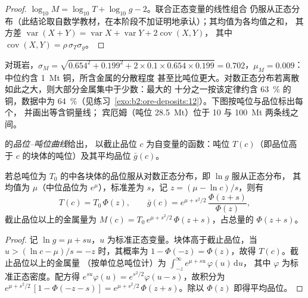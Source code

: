 \begin{proof}
$\log_{10} M = \log_{10} T + \log_{10} g - 2$。联合正态变量的线性组合
仍服从正态分布（此结论取自数学教材，在本阶段不加证明地承认）；其均值为各均值之和，
其方差 $\operatorname{var}(X + Y) = \operatorname{var} X + \operatorname{var} Y + 2\operatorname{cov}(X, Y)$，
其中 $\operatorname{cov}(X, Y) = \rho\,\sigma_T\sigma_g$。
\end{proof}

对斑岩，$\sigma_M = \sqrt{0.654^2 + 0.199^2 + 2 \times 0.1 \times 0.654 \times
0.199} = 0.702$，$\mu_M = 0.009$：中位约含 \qty{1}{Mt} 铜，所含金属的分散程度
甚至比吨位更大。对数正态分布若离散如此之大，则大部分金属集中于少数：最大的
十分之一按该定律约含 \qty{63}{\percent} 的
铜，数据中为 \qty{64}{\percent}（见练习~\ref{exo:b2:ore-deposits:12}）。下图按吨位与品位标出每个，
并画出等含铜量线；
宾厄姆（吨位 \qty{28.5}{Mt}）位于 10 与 \qty{100}{Mt} 两条线之间。

\begin{definition}[品位–吨位曲线]\label{def:b2:ore-deposits:gt}
的\emph{品位–吨位曲线}给出，
以截止品位 $c$ 为自变量的函数：吨位 $T(c)$（即品位高于 $c$ 的块体的吨位）及其平均品位
$\bar g(c)$。
\end{definition}

\begin{proposition}\label{prop:b2:ore-deposits:gt}
若总吨位为 $T_0$ 的中各块体的品位服从对数正态分布，即 $\ln g$ 服从正态分布，
其均值为 $\mu$（中位品位为 $e^{\mu}$），标准差为 $s$，记 $z = (\mu -
\ln c)/s$，则有
\begin{equation}
T(c) = T_0\,\Phi(z), \qquad
\bar g(c) = e^{\mu + s^2/2}\,\frac{\Phi(z + s)}{\Phi(z)} ,
\label{eq:b2:ore-deposits:gt}
\end{equation}
截止品位以上的金属量为 $M(c) = T_0\,e^{\mu + s^2/2}\,\Phi(z + s)$，占总量的 $\Phi(z +
s)$。
\end{proposition}

\begin{proof}
记 $\ln g = \mu + s u$，$u$ 为标准正态变量。块体高于截止品位，当 $u > (\ln c -
\mu)/s = -z$ 时，其概率为 $1 - \Phi(-z) = \Phi(z)$，故得 $T(c)$。截止品位以上的金属量
（按单位总吨位计）为 $\int_{-z}^{\infty} e^{\mu + s u}\,\varphi(u)\,\mathrm{d}u$，
其中 $\varphi$ 为标准正态密度。配方得 $e^{su}\varphi(u) =
e^{s^2/2}\varphi(u - s)$，故积分为 $e^{\mu + s^2/2}\,[1 - \Phi(-z - s)] = e^{\mu +
s^2/2}\,\Phi(z + s)$。除以 $\Phi(z)$ 即得平均品位。
\end{proof}

